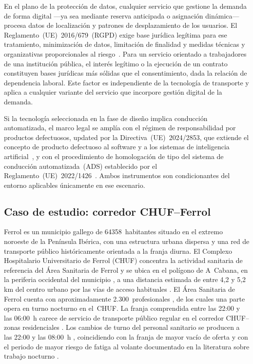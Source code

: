 En el plano de la protección de datos, cualquier servicio que 
gestione la demanda de forma digital ---ya sea mediante 
reserva anticipada o asignación dinámica--- procesa datos de 
localización y patrones de desplazamiento de los usuarios. 
El Reglamento~(UE)~2016/679~(RGPD) exige base jurídica 
legítima para ese tratamiento, minimización de datos, 
limitación de finalidad y medidas técnicas y organizativas 
proporcionales al riesgo~\parencite{GDPR20162016679}. Para 
un servicio orientado a trabajadores de una institución 
pública, el interés legítimo o la ejecución de un contrato 
constituyen bases jurídicas más sólidas que el consentimiento, 
dada la relación de dependencia laboral. Este factor es 
independiente de la tecnología de transporte y aplica a 
cualquier variante del servicio que incorpore gestión digital 
de la demanda.

Si la tecnología seleccionada en la fase de diseño implica 
conducción automatizada, el marco legal se amplía con el 
régimen de responsabilidad por productos defectuosos, 
updated por la Directiva~(UE)~2024/2853, que extiende 
el concepto de producto defectuoso al software y a los 
sistemas de inteligencia artificial~\parencite{DirectivaUE20242853}, 
y con el procedimiento de homologación de tipo del sistema 
de conducción automatizada~(ADS) establecido por el 
Reglamento~(UE)~2022/1426~\parencite{RegUE20221426}. Ambos 
instrumentos son condicionantes del entorno aplicables 
únicamente en ese escenario.

\subsection{Caso de estudio: corredor CHUF--Ferrol}
\label{sec:caso-ferrol}

Ferrol es un municipio gallego de \num{64358}~habitantes
\parencite{INE2024Ferrol} situado en el extremo noroeste de la
Península Ibérica, con una estructura urbana dispersa y una red de
transporte público históricamente orientada a la franja diurna. El
Complexo Hospitalario Universitario de Ferrol (CHUF) concentra la
actividad sanitaria de referencia del Área Sanitaria de Ferrol y se
ubica en el polígono de A~Cabana, en la periferia occidental del
municipio \parencite{Sanidad2024CHUF}, a una distancia estimada de entre
4,2 y 5,2\,km del centro urbano por las vías de acceso habituales
\parencite{GoogleMaps2026Ferrol}.
El \'{A}rea Sanitaria de Ferrol cuenta con aproximadamente
2.300~profesionales \parencite{SERGASFerrol2025}, de los
cuales una parte opera en turno nocturno en el~CHUF.
La franja comprendida entre las 22:00 y las 06:00~h carece de servicio
de transporte público regular en el corredor CHUF--zonas residenciales
\parencite{Alsaferrol2024horarios,RenfeCercaniasFerrol2026}. Los cambios
de turno del personal sanitario se producen a las 22:00 y las 08:00~h
\parencite{XuntaGalicia2025dog}, coincidiendo con la franja de mayor vacío de oferta y con el periodo 
de mayor riesgo de fatiga al volante documentado en la literatura 
sobre trabajo nocturno \parencite{SanchezSellero2025, Eurofound2020Sectors}.



